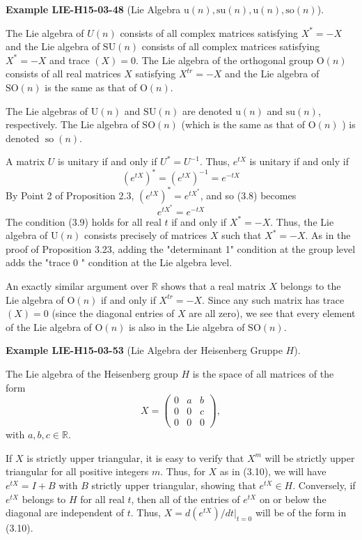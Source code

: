 \documentclass[10pt, letterpaper]{article}
\newcommand{\CustomHeading}[3]{%
  \par\medskip\noindent%
  \textbf{#1 #2} \textnormal{(#3)}.\enskip%
}
\newenvironment{EXA}[2]{\CustomHeading{Example}{#1}{#2}}{}
\begin{document}
\begin{EXA}{LIE-H15-03-48}{Lie Algebra $\mathrm{u}(n),\mathrm{su}(n),\mathrm{u}(n),\mathrm{so}(n)$}
The Lie algebra of $U(n)$ consists of all complex matrices satisfying $X^{*}=-X$ and the Lie algebra of $\mathrm{SU}(n)$ consists of all complex matrices satisfying $X^{*}=-X$ and trace $(X)=0$. The Lie algebra of the orthogonal group $\mathrm{O}(n)$ consists of all real matrices $X$ satisfying $X^{t r}=-X$ and the Lie algebra of $\mathrm{SO}(n)$ is the same as that of $\mathrm{O}(n)$.

The Lie algebras of $\mathrm{U}(n)$ and $\mathrm{SU}(n)$ are denoted $\mathrm{u}(n)$ and $\mathrm{su}(n)$, respectively. The Lie algebra of $\mathrm{SO}(n)$ (which is the same as that of $\mathrm{O}(n)$ ) is denoted $\operatorname{so}(n)$.

A matrix $U$ is unitary if and only if $U^{*}=U^{-1}$. Thus, $e^{t X}$ is unitary if and only if
$$
\left(e^{t X}\right)^{*}=\left(e^{t X}\right)^{-1}=e^{-t X}
$$
By Point 2 of Proposition 2.3, $\left(e^{t X}\right)^{*}=e^{t X^{*}}$, and so (3.8) becomes
$$
e^{t X^{*}}=e^{-t X}
$$
The condition (3.9) holds for all real $t$ if and only if $X^{*}=-X$. Thus, the Lie algebra of $\mathrm{U}(n)$ consists precisely of matrices $X$ such that $X^{*}=-X$. As in the proof of Proposition 3.23, adding the "determinant 1" condition at the group level adds the "trace 0 " condition at the Lie algebra level.

An exactly similar argument over $\mathbb{R}$ shows that a real matrix $X$ belongs to the Lie algebra of $\mathrm{O}(n)$ if and only if $X^{t r}=-X$. Since any such matrix has trace $(X)=0$ (since the diagonal entries of $X$ are all zero), we see that every element of the Lie algebra of $\mathrm{O}(n)$ is also in the Lie algebra of $\mathrm{SO}(n)$.
\end{EXA}

\begin{EXA}{LIE-H15-03-53}{Lie Algebra der Heisenberg Gruppe $H$}
The Lie algebra of the Heisenberg group $H$ is the space of all matrices of the form
$$
X=\left(\begin{array}{lll}
0 & a & b \\
0 & 0 & c \\
0 & 0 & 0
\end{array}\right),
$$
with $a, b, c \in \mathbb{R}$.

If $X$ is strictly upper triangular, it is easy to verify that $X^{m}$ will be strictly upper triangular for all positive integers $m$. Thus, for $X$ as in (3.10), we will have $e^{t X}=I+B$ with $B$ strictly upper triangular, showing that $e^{t X} \in H$. Conversely, if $e^{t X}$ belongs to $H$ for all real $t$, then all of the entries of $e^{t X}$ on or below the diagonal are independent of $t$. Thus, $X=d\left(e^{t X}\right) /\left.d t\right|_{t=0}$ will be of the form in (3.10).
\end{EXA}
\end{document}
